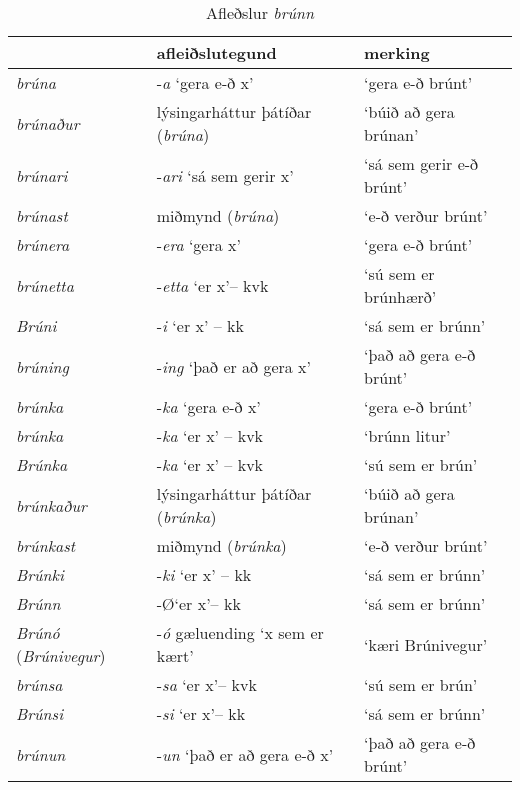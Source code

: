\documentclass[../samsetningasafn.tex]{subfiles}
\begin{document}
\begin{table}[ht!]%
\begin{footnotesize}
\begin{tcolorbox}
	\begin{center}
	\begin{tabularx}{\textwidth}{Xll}
						&	\textbf{afleiðslutegund}					&	\textbf{merking}	\\
	\hline
	\textit{brúna}		&	-\textit{a} \lq gera e-ð x\rq				&	\lq gera e-ð brúnt\rq	\\
	\textit{brúnaður}	&	lýsingarháttur þátíðar (\textit{brúna})		&	\lq búið að gera brúnan\rq	\\
	\textit{brúnari}		&	-\textit{ari} \lq sá sem gerir x\rq 			&	\lq sá sem gerir e-ð brúnt\rq	\\
	\textit{brúnast}		&	miðmynd (\textit{brúna})					&	\lq e-ð verður brúnt\rq	\\
	\textit{brúnera}		&	-\textit{era} \lq gera x\rq{} 				&	\lq gera e-ð brúnt\rq		\\
	\textit{brúnetta}		&	-\textit{etta} \lq er x\rq -- kvk			&	\lq sú sem er brúnhærð\rq	\\
	\textit{Brúni}		&	-\textit{i} \lq er x\rq{} -- kk 				&	\lq sá sem er brúnn\rq	\\
	\textit{brúning}		&	-\textit{ing} \lq það er að gera x\rq		&	\lq það að gera e-ð brúnt\rq	\\
	\textit{brúnka}		&	-\textit{ka} \lq gera e-ð x\rq{} 			&	\lq gera e-ð brúnt\rq	\\
	\textit{brúnka}		&	-\textit{ka} \lq er x\rq{} -- kvk			&	\lq brúnn litur\rq	\\
	\textit{Brúnka}		&	-\textit{ka} \lq er x\rq{} -- kvk			&	\lq sú sem er brún\rq	\\
	\textit{brúnkaður}	&	lýsingarháttur þátíðar (\textit{brúnka})	&	\lq búið að gera brúnan\rq	\\
	\textit{brúnkast}		&	miðmynd (\textit{brúnka})				&	\lq e-ð verður brúnt\rq	\\
	\textit{Brúnki}		&	-\textit{ki} \lq er x\rq{} -- kk 				&	\lq sá sem er brúnn\rq	\\
	\textit{Brúnn}		&	-\O \lq er x\rq -- kk						&	\lq sá sem er brúnn\rq		\\
	\textit{Brúnó} (\textit{Brúnivegur})	&	-\textit{ó} gæluending \lq x sem er kært\rq	&	\lq kæri Brúnivegur\rq \\
	\textit{brúnsa}		&	-\textit{sa} \lq er x\rq -- kvk				&	\lq sú sem er brún\rq	\\
	\textit{Brúnsi}		&	-\textit{si} \lq er x\rq -- kk				&	\lq sá sem er brúnn\rq	\\
	\textit{brúnun}		&	-\textit{un} \lq það er að gera e-ð x\rq	&	\lq það að gera e-ð brúnt\rq	\\
	\end{tabularx}
	\end{center}
\end{tcolorbox}
\end{footnotesize}
	\caption{Afleðslur \textit{brúnn}}
	\label{tafla:brafl}
\end{table}

\clearpage
\end{document}
